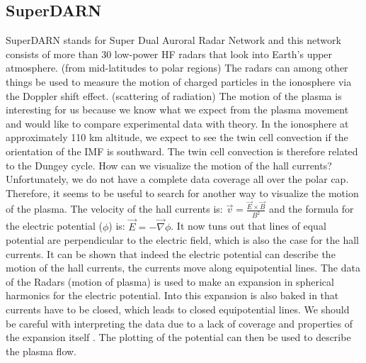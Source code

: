 \documentclass[10pt,a4paper]{article}
\begin{document}
\subsection{SuperDARN \label{0_CHAPTER_SUPERDARN}}
SuperDARN stands for  Super Dual Auroral Radar Network and this network consists of more than 30 low-power HF radars that look into Earth's upper atmosphere. 
(from mid-latitudes to polar regions) The radars can among other things be used to measure the motion of charged particles in the ionosphere via the Doppler shift effect. 
(scattering of radiation) The motion of the plasma is interesting for us because we know what we expect from the plasma movement and would like to compare experimental data 
with theory. In the ionosphere at approximately 110 km altitude, we expect to see the twin cell convection if the orientation of the IMF is southward. The twin cell convection is therefore related to the Dungey cycle. 
How can we visualize the motion of the hall currents? Unfortunately, we do not have a complete data coverage all over the polar cap. Therefore, it seems to be useful 
to search for another way to visualize the motion of the plasma. The velocity of the hall currents is: $\vec{v}=\frac{\vec{E}\times \vec{B}}{B^2}$ and the formula for 
the electric potential ($\phi$) is: $\vec{E}=-\vec{\nabla} \phi$. It now tuns out that lines of equal potential are perpendicular to the electric field, which is also the case 
for the hall currents. It can be shown that indeed the electric potential can describe the motion of the hall currents, the currents move along equipotential lines. 
The data of the Radars (motion of plasma) is used to make an expansion in spherical harmonics for the electric potential. Into this expansion is also baked in that currents have to be closed, which leads to closed equipotential lines. We should be careful with interpreting the data due to a lack of coverage and properties of the expansion itself . The plotting of the potential can then be used to describe the plasma flow. 
\end{document}
